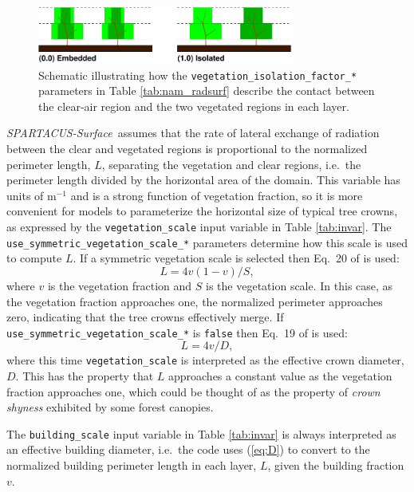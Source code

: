 \documentclass[a4,oneside]{article}
\def\codesize{\small}
\def\spsurf{\emph{SPARTACUS-Surface}}
\def\code#1{{\codesize\texttt{#1}}}
\begin{document}
\begin{figure}[b!]
  \centerline{\includegraphics[width=0.75\textwidth]{isolation_schematic.pdf}}
  \caption{\label{fig:isolation_schematic}Schematic illustrating how
    the \code{vegetation\_isolation\_factor\_*} parameters in Table
    \ref{tab:nam_radsurf} describe the contact between the clear-air
    region and the two vegetated regions in each layer.}
\end{figure}

\spsurf\ assumes that the rate of lateral exchange of radiation
between the clear and vegetated regions is proportional to the
normalized perimeter length, $L$, separating the vegetation and clear
regions, i.e.\ the perimeter length divided by the horizontal area of
the domain. This variable has units of m$^{-1}$ and is a strong
function of vegetation fraction, so it is more convenient for models to
parameterize the horizontal size of typical tree crowns, as expressed
by the \code{vegetation\_scale} input variable in Table
\ref{tab:invar}. The \code{use\_symmetric\_vegetation\_scale\_*}
parameters determine how this scale is used to compute $L$.  If a
symmetric vegetation scale is selected then Eq.\ 20 of
\cite{Hogan+2018} is used:
%
\begin{equation}
  L=4v(1-v)/S,\label{eq:S}
\end{equation}
%
where $v$ is the vegetation fraction and $S$ is the vegetation scale.
In this case, as the vegetation fraction approaches one, the
normalized perimeter approaches zero, indicating that the tree crowns
effectively merge. If \code{use\_symmetric\_vegetation\_scale\_*} is
\code{false} then Eq.\ 19 of \cite{Hogan+2018} is used:
%
\begin{equation}
  L=4v/D,\label{eq:D}
\end{equation}
%
where this time \code{vegetation\_scale} is interpreted as the
effective crown diameter, $D$. This has the property that $L$
approaches a constant value as the vegetation fraction approaches one,
which could be thought of as the property of \emph{crown shyness}
exhibited by some forest canopies.

The \code{building\_scale} input variable in Table \ref{tab:invar} is
always interpreted as an effective building diameter, i.e.\ the code
uses (\ref{eq:D}) to convert to the normalized building perimeter
length in each layer, $L$, given the building fraction $v$.
\end{document}
